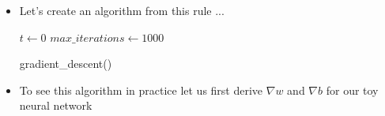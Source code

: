 \begin{frame}
	\begin{overlayarea}{\textwidth}{\textheight}
		
		\begin{itemize}\justifying
			    
			\item <1-> Let's create an algorithm from this rule ... 
			      
			       {
			      	\begin{algorithm}[H]
			      		\SetAlgoLined
			      		$t \leftarrow 0$\; 
			      		$max\_iterations\leftarrow 1000$\;
			      		\caption{gradient\_descent()}
			      	\end{algorithm}
			      }
			      
			\item <2-> To see this algorithm in practice let us first derive $\nabla w$ and $\nabla b$ for our toy neural network
			      
		\end{itemize}
		
	\end{overlayarea}
	
\end{frame}

